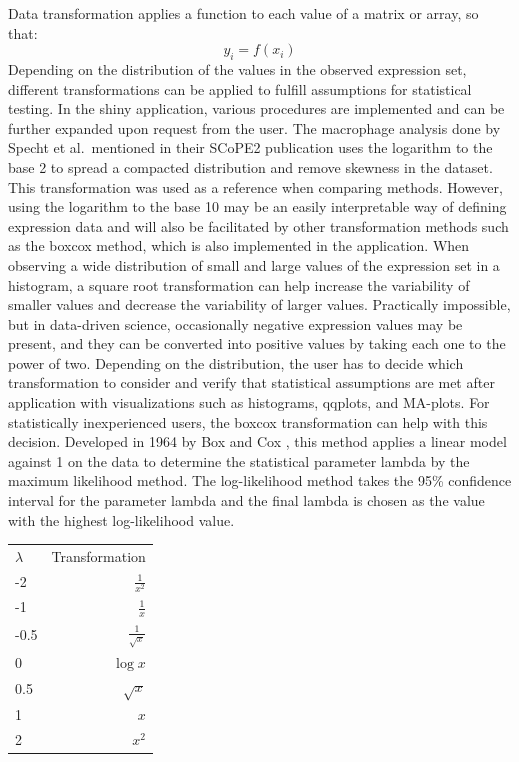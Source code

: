 \documentclass[
  11pt,
]{article}
\begin{document}
Data transformation applies a function to each value of a matrix or
array, so that: \[
y_i = f(x_i)
\] Depending on the distribution of the values in the observed
expression set, different transformations can be applied to fulfill
assumptions for statistical testing. In the shiny application, various
procedures are implemented and can be further expanded upon request from
the user. The macrophage analysis done by Specht et al.~mentioned in
their SCoPE2 publication \citep{Specht2021} uses the logarithm to the
base 2 to spread a compacted distribution and remove skewness in the
dataset. This transformation was used as a reference when comparing
methods. However, using the logarithm to the base 10 may be an easily
interpretable way of defining expression data and will also be
facilitated by other transformation methods such as the boxcox method,
which is also implemented in the application. When observing a wide
distribution of small and large values of the expression set in a
histogram, a square root transformation can help increase the
variability of smaller values and decrease the variability of larger
values. Practically impossible, but in data-driven science, occasionally
negative expression values may be present, and they can be converted
into positive values by taking each one to the power of two. Depending
on the distribution, the user has to decide which transformation to
consider and verify that statistical assumptions are met after
application with visualizations such as histograms, qqplots, and
MA-plots. For statistically inexperienced users, the boxcox
transformation can help with this decision. Developed in 1964 by Box and
Cox \citep{Sakia1992}, this method applies a linear model against 1 on
the data to determine the statistical parameter lambda by the maximum
likelihood method. The log-likelihood method takes the 95\% confidence
interval for the parameter lambda and the final lambda is chosen as the
value with the highest log-likelihood value.

\begin{center}
\begin{tabular}{l r}
$\lambda$ & Transformation \\
-2 & $\frac{1}{x^2}$ \\
-1 & $\frac{1}{x}$ \\
-0.5 & $\frac{1}{\sqrt{x}}$ \\
0 & $\log{x}$ \\
0.5 & $\sqrt{x}$ \\
1 & $x$ \\
2 & $x^2$
\end{tabular}
\end{center}
\end{document}
